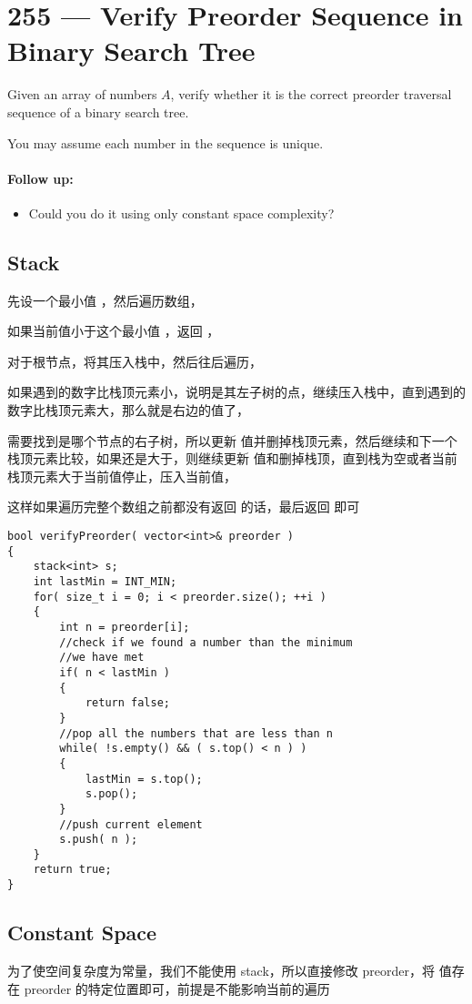 \section{255 --- Verify Preorder Sequence in Binary Search Tree}
Given an array of numbers $A$, verify whether it is the correct preorder traversal sequence of a binary search tree.
\par
You may assume each number in the sequence is unique.
\paragraph{Follow up:}
\begin{itemize}
\item Could you do it using only constant space complexity?
\end{itemize}
\subsection{Stack}
先设一个最小值 ，然后遍历数组，

如果当前值小于这个最小值 ，返回 ，

对于根节点，将其压入栈中，然后往后遍历，

如果遇到的数字比栈顶元素小，说明是其左子树的点，继续压入栈中，直到遇到的数字比栈顶元素大，那么就是右边的值了，

需要找到是哪个节点的右子树，所以更新  值并删掉栈顶元素，然后继续和下一个栈顶元素比较，如果还是大于，则继续更新  值和删掉栈顶，直到栈为空或者当前栈顶元素大于当前值停止，压入当前值，

这样如果遍历完整个数组之前都没有返回  的话，最后返回  即可

\setcounter{lstlisting}{0}
\begin{lstlisting}[style=customc, caption={Stack}]
bool verifyPreorder( vector<int>& preorder )
{
    stack<int> s;
    int lastMin = INT_MIN;
    for( size_t i = 0; i < preorder.size(); ++i )
    {
        int n = preorder[i];
        //check if we found a number than the minimum
        //we have met
        if( n < lastMin )
        {
            return false;
        }
        //pop all the numbers that are less than n
        while( !s.empty() && ( s.top() < n ) )
        {
            lastMin = s.top();
            s.pop();
        }
        //push current element
        s.push( n );
    }
    return true;
}
\end{lstlisting}
\subsection{Constant Space}
为了使空间复杂度为常量，我们不能使用 stack，所以直接修改 preorder，将  值存在 preorder 的特定位置即可，前提是不能影响当前的遍历

